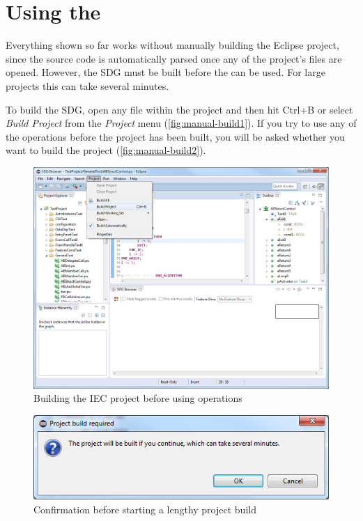 \section{Using the \SB} \label{sec:manual-sdg}

Everything shown so far works without manually building the Eclipse project, since the source code is automatically 
parsed once any of the project's files are opened. However, the SDG must be built before the \SB can be used. For large 
projects this can take several minutes.

To build the SDG, open any file within the project and then hit Ctrl+B or select \emph{Build Project} from the 
\emph{Project} menu (\autoref{fig:manual-build1}). If you try to use any of the \SB operations before the project has 
been built, you will be asked whether you want to build the project (\autoref{fig:manual-build2}).

\begin{figure}[hp]
  \centering
    \includegraphics[width=\textwidth]{bilder/manual-build1}
  \caption{Building the IEC project before using \SB operations}
  \label{fig:manual-build1}
\end{figure}

\begin{figure}[hp]
  \centering
    \includegraphics[scale=0.55]{bilder/manual-build2}
  \caption{Confirmation before starting a lengthy project build}
  \label{fig:manual-build2}
\end{figure}


